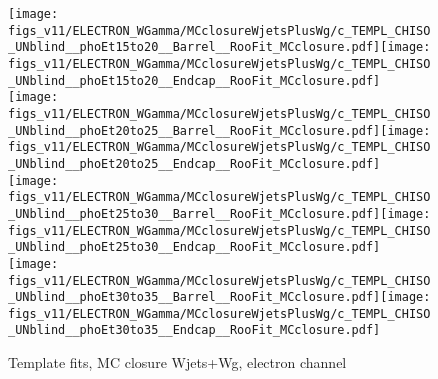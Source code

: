 \begin{figure}[htb]
  \begin{center}
   \texttt{[image: figs\_v11/ELECTRON\_WGamma/MCclosureWjetsPlusWg/c\_TEMPL\_CHISO\_UNblind\_\_phoEt15to20\_\_Barrel\_\_RooFit\_MCclosure.pdf]}\texttt{[image: figs\_v11/ELECTRON\_WGamma/MCclosureWjetsPlusWg/c\_TEMPL\_CHISO\_UNblind\_\_phoEt15to20\_\_Endcap\_\_RooFit\_MCclosure.pdf]}\\
   \texttt{[image: figs\_v11/ELECTRON\_WGamma/MCclosureWjetsPlusWg/c\_TEMPL\_CHISO\_UNblind\_\_phoEt20to25\_\_Barrel\_\_RooFit\_MCclosure.pdf]}\texttt{[image: figs\_v11/ELECTRON\_WGamma/MCclosureWjetsPlusWg/c\_TEMPL\_CHISO\_UNblind\_\_phoEt20to25\_\_Endcap\_\_RooFit\_MCclosure.pdf]}\\
   \texttt{[image: figs\_v11/ELECTRON\_WGamma/MCclosureWjetsPlusWg/c\_TEMPL\_CHISO\_UNblind\_\_phoEt25to30\_\_Barrel\_\_RooFit\_MCclosure.pdf]}\texttt{[image: figs\_v11/ELECTRON\_WGamma/MCclosureWjetsPlusWg/c\_TEMPL\_CHISO\_UNblind\_\_phoEt25to30\_\_Endcap\_\_RooFit\_MCclosure.pdf]}\\
   \texttt{[image: figs\_v11/ELECTRON\_WGamma/MCclosureWjetsPlusWg/c\_TEMPL\_CHISO\_UNblind\_\_phoEt30to35\_\_Barrel\_\_RooFit\_MCclosure.pdf]}\texttt{[image: figs\_v11/ELECTRON\_WGamma/MCclosureWjetsPlusWg/c\_TEMPL\_CHISO\_UNblind\_\_phoEt30to35\_\_Endcap\_\_RooFit\_MCclosure.pdf]}\\
  \label{fig:templateFits_MCclosureWjetsPlusWg_CHISO_ELECTRON_1}
  \caption{Template fits, MC closure Wjets+Wg, electron channel}
  \end{center}
\end{figure}

